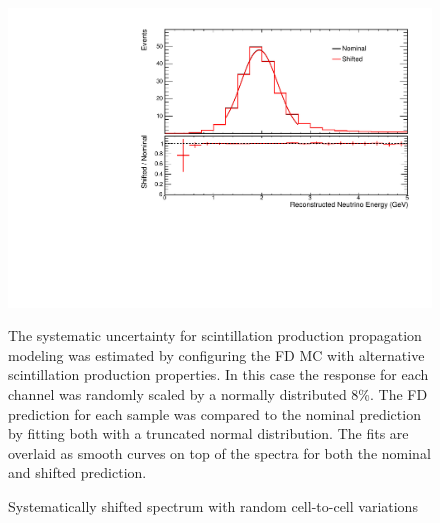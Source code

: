 {\begin{figure}
\begin{center}
\includegraphics[width=\textwidth]{figures/systs/params/fd_randomcal.pdf}
\end{center}
\caption{Systematically shifted spectrum with random cell-to-cell variations}{
The systematic uncertainty for scintillation production propagation modeling
was estimated by configuring the FD MC with alternative
scintillation production properties.
In this case the response for each channel was randomly scaled
by a normally distributed 8\%.
The FD prediction for each sample was compared to the nominal prediction
by fitting both with a truncated normal distribution.
The fits are overlaid as smooth curves on top of the spectra for both
the nominal and shifted prediction.
}
\label{syst_param_randomcal}
\end{figure}


}
